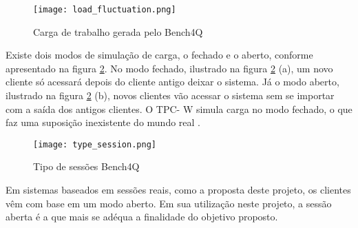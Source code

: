 
\begin{figure}[htb]
	\centering
	\texttt{[image: load\_fluctuation.png]}
	\caption{Carga de trabalho gerada pelo Bench4Q}
	\label{fig:carga-gerada}
\end{figure}


Existe dois modos de simulação de carga, o fechado e o aberto, conforme apresentado na figura \ref{fig:type-session}. No modo fechado, ilustrado na figura \ref{fig:type-session} (a), um novo cliente só acessará depois do cliente antigo deixar o sistema. Já o modo aberto, ilustrado na figura \ref{fig:type-session} (b), novos clientes vão acessar o sistema sem se importar com a saída dos antigos clientes. O TPC- W simula carga no modo fechado, o que faz uma suposição inexistente do mundo real \cite{Bench4Q}. 

\begin{figure}[htb]
	\centering
	\texttt{[image: type\_session.png]}
	\caption{Tipo de sessões Bench4Q}
	\label{fig:type-session}
\end{figure}


Em sistemas baseados em sessões reais, como a proposta deste projeto, os clientes vêm com base em um modo aberto. Em sua utilização neste projeto, a sessão aberta é a que mais se adéqua a finalidade do objetivo proposto.


